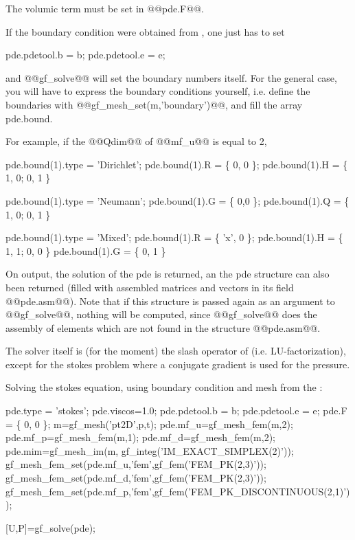 \begin{cmddescription}
  The volumic term must be set in @@pde.F@@.

  If the boundary condition were obtained from \pdetool, one just has to set
  \begin{mcode}
pde.pdetool.b = b;       
pde.pdetool.e = e;
  \end{mcode}
  and @@gf_solve@@ will set the boundary numbers itself.  For the
  general case, you will have to express the boundary conditions
  yourself, i.e. define the boundaries with
  @@gf_mesh_set(m,'boundary')@@, and fill the array pde.bound.

  For example, if the @@Qdim@@ of @@mf_u@@ is equal to 2,
  \begin{mcode}
pde.bound(1).type = 'Dirichlet';
pde.bound(1).R = \{ 0, 0 \};
pde.bound(1).H = \{ 1, 0; 0, 1 \} %

pde.bound(1).type = 'Neumann';
pde.bound(1).G = \{ 0,0 \};
pde.bound(1).Q = \{ 1, 0; 0, 1 \} %
    
pde.bound(1).type = 'Mixed';
pde.bound(1).R = \{ 'x', 0 \};
pde.bound(1).H = \{ 1, 1; 0, 0 \} %
pde.bound(1).G = \{ 0, 1 \} 
  \end{mcode}
  
  On output, the solution of the pde is returned, an the pde structure
  can also been returned (filled with assembled matrices and vectors
  in its field @@pde.asm@@). Note that if this structure is passed
  again as an argument to @@gf_solve@@, nothing will be computed,
  since @@gf_solve@@ does the assembly of elements which are not found
  in the structure @@pde.asm@@.
  
  The solver itself is (for the moment) the slash operator of \mlab
  (i.e. LU-factorization), except for the stokes problem where a
  conjugate gradient is used for the pressure.
\end{cmddescription}
\begin{cmdexamples}
Solving the stokes equation, using boundary condition and mesh from the \pdetool:
\begin{mcode}
pde.type = 'stokes';
pde.viscos=1.0;
pde.pdetool.b = b;       %
pde.pdetool.e = e;
pde.F = \{ 0, 0 \};   %
m=gf\_mesh('pt2D',p,t);   %
pde.mf\_u=gf\_mesh\_fem(m,2);   %
pde.mf\_p=gf\_mesh\_fem(m,1);   %
pde.mf\_d=gf\_mesh\_fem(m,2); 
pde.mim=gf\_mesh\_im(m, gf\_integ('IM\_EXACT\_SIMPLEX(2)'));
gf\_mesh\_fem\_set(pde.mf\_u,'fem',gf\_fem('FEM\_PK(2,3)'));
gf\_mesh\_fem\_set(pde.mf\_d,'fem',gf\_fem('FEM\_PK(2,3)'));
gf\_mesh\_fem\_set(pde.mf\_p,'fem',gf\_fem('FEM\_PK\_DISCONTINUOUS(2,1)'));

[U,P]=gf\_solve(pde);
\end{mcode}

\end{cmdexamples}
